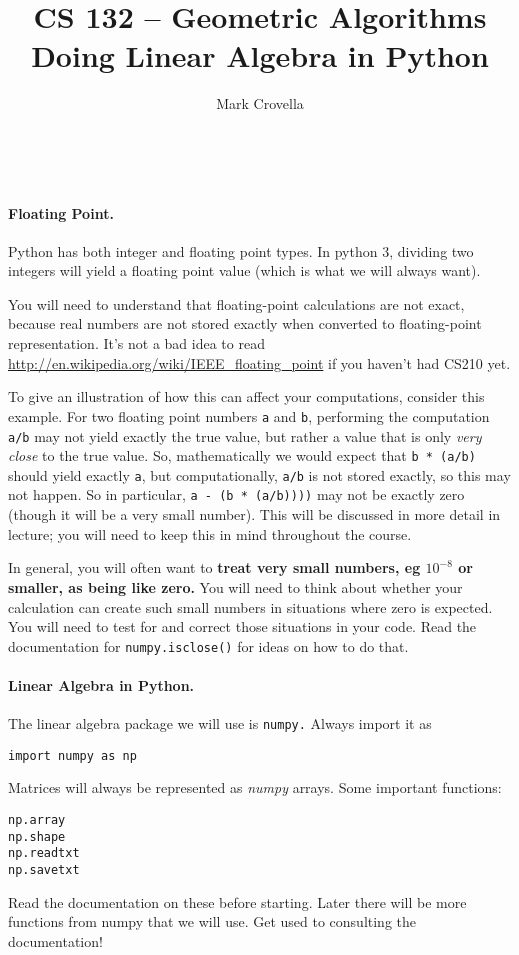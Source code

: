 \documentclass{article}
\begin{document}
\thispagestyle{empty}

\title{CS 132 -- Geometric Algorithms\\[0.25\baselineskip]Doing Linear Algebra in Python}
\author{Mark Crovella}
\date{~}
\maketitle

\paragraph{Floating Point.}  Python has both integer and floating point types.  In python 3, dividing two integers will yield a floating point value (which is what we will always want).

You will need to understand that floating-point calculations are not
exact, because real numbers are not stored exactly when converted to
floating-point representation.   It's not a bad idea to read
\url{http://en.wikipedia.org/wiki/IEEE_floating_point} if you haven't
had CS210 yet.    

To give an illustration of how this can affect your computations,
consider this example.   For two floating point numbers \texttt{a} and
\texttt{b}, performing the computation \texttt{a/b} may not yield
exactly the true value, but rather a value that is only \emph{very
  close} to the true value.    So, mathematically we would expect that
\texttt{b * (a/b)} should yield exactly \texttt{a}, but computationally,
\texttt{a/b} is not stored exactly, so this may not happen.   So in
particular, \texttt{a - (b * (a/b))))} may not be exactly zero (though
it will be a very small number).   This will be discussed in more detail in lecture; you
will need to keep this in mind throughout the course. 

In general, you will often want to \textbf{treat very small numbers, eg
  $10^{-8}$ or smaller, as being like zero.}   You will need to think about whether
your calculation can create such small numbers in situations where zero
is expected.   You will need to test for and correct those situations in
your code.   Read the documentation for \texttt{numpy.isclose()} for
ideas on how to do that.

\paragraph{Linear Algebra in Python.} The linear algebra package we will use is \texttt{numpy.}  Always import it as
\begin{verbatim}
import numpy as np
\end{verbatim}
Matrices will always be represented as \emph{numpy} arrays.   Some important functions:
\begin{verbatim}
np.array
np.shape
np.readtxt
np.savetxt
\end{verbatim}
Read the documentation on these before starting.  Later there will be more functions from numpy that we will use.  Get used to consulting the documentation!
\end{document}
